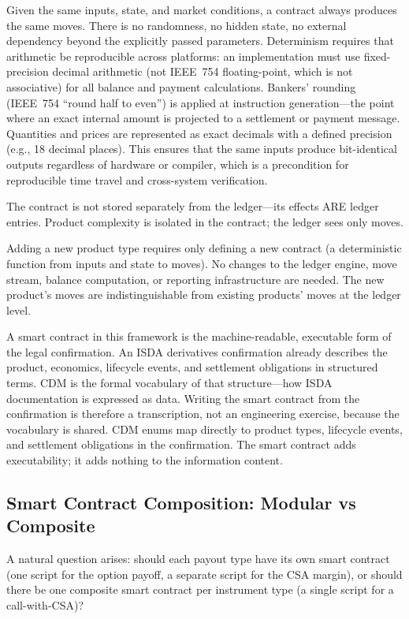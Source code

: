 \documentclass[11pt,a4paper]{article}
\begin{document}
\noindent Given the same inputs, state, and market conditions, a contract always produces the same moves. There is no randomness, no hidden state, no external dependency beyond the explicitly passed parameters. Determinism requires that arithmetic be reproducible across platforms: an implementation must use fixed-precision decimal arithmetic (not IEEE~754 floating-point, which is not associative) for all balance and payment calculations. Bankers' rounding (IEEE~754 ``round half to even'') is applied at instruction generation---the point where an exact internal amount is projected to a settlement or payment message. Quantities and prices are represented as exact decimals with a defined precision (e.g., 18 decimal places). This ensures that the same inputs produce bit-identical outputs regardless of hardware or compiler, which is a precondition for reproducible time travel and cross-system verification.

The contract is not stored separately from the ledger---its effects ARE ledger entries. Product complexity is isolated in the contract; the ledger sees only moves.

Adding a new product type requires only defining a new contract (a deterministic function from inputs and state to moves). No changes to the ledger engine, move stream, balance computation, or reporting infrastructure are needed. The new product's moves are indistinguishable from existing products' moves at the ledger level.

A smart contract in this framework is the machine-readable, executable form of the legal confirmation. An ISDA derivatives confirmation already describes the product, economics, lifecycle events, and settlement obligations in structured terms. CDM is the formal vocabulary of that structure---how ISDA documentation is expressed as data. Writing the smart contract from the confirmation is therefore a transcription, not an engineering exercise, because the vocabulary is shared. CDM enums map directly to product types, lifecycle events, and settlement obligations in the confirmation. The smart contract adds executability; it adds nothing to the information content.

\subsection{Smart Contract Composition: Modular vs Composite}

A natural question arises: should each payout type have its own smart contract (one script for the option payoff, a separate script for the CSA margin), or should there be one composite smart contract per instrument type (a single script for a call-with-CSA)?
\end{document}
